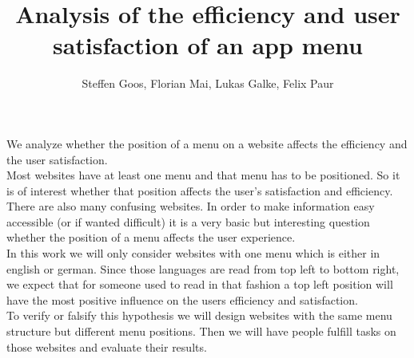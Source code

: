 \documentclass[a4paper]{article}
\author{Steffen Goos, Florian Mai, Lukas Galke, Felix Paur}
\title{Analysis of the efficiency and user satisfaction of an app menu}
\begin{document}
\maketitle
We analyze whether the position of a menu on a website affects the efficiency and the user satisfaction.\\
Most websites have at least one menu and that menu has to be positioned.
So it is of interest whether that position affects the user's satisfaction and efficiency.
There are also many confusing websites.
In order to make information easy accessible (or if wanted difficult) it is a very basic but interesting question
whether the position of a menu affects the user experience.\\
In this work we will only consider websites with one menu which is either in english or german.
Since those languages are read from top left to bottom right,
we expect that for someone used to read in that fashion a top left position will have the most positive influence
on the users efficiency and satisfaction.\\
To verify or falsify this hypothesis we will design websites with the same menu structure but different menu positions.
Then we will have people fulfill tasks on those websites and evaluate their results.
\end{document}
